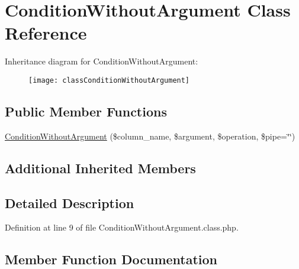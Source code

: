 \hypertarget{classConditionWithoutArgument}{}\section{Condition\+Without\+Argument Class Reference}
\label{classConditionWithoutArgument}
Inheritance diagram for Condition\+Without\+Argument\+:\begin{figure}[H]
\begin{center}
\leavevmode
\texttt{[image: classConditionWithoutArgument]}
\end{center}
\end{figure}
\subsection*{Public Member Functions}
\begin{DoxyCompactItemize}
\item 
\hyperlink{classConditionWithoutArgument_a42d42e70c74111b4980e2916b64c95e7}{Condition\+Without\+Argument} (\$column\+\_\+name, \$argument, \$operation, \$pipe=\char`\"{}\char`\"{})
\end{DoxyCompactItemize}
\subsection*{Additional Inherited Members}


\subsection{Detailed Description}


Definition at line 9 of file Condition\+Without\+Argument.\+class.\+php.



\subsection{Member Function Documentation}
\hypertarget{classConditionWithoutArgument_a42d42e70c74111b4980e2916b64c95e7}{}
